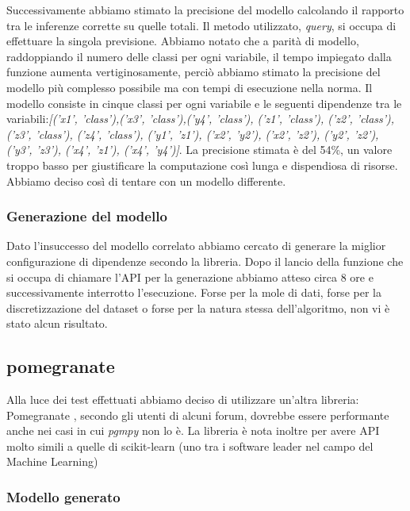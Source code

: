 \documentclass[12pt]{article}
\begin{document}
Successivamente abbiamo stimato la precisione del modello calcolando il rapporto tra le inferenze corrette su quelle totali. Il metodo utilizzato, \emph{query}, si occupa di effettuare la singola previsione. Abbiamo notato che a parità di modello, raddoppiando il numero delle classi per ogni variabile, il tempo impiegato dalla funzione aumenta vertiginosamente, perciò abbiamo stimato la precisione del modello più complesso possibile ma con tempi di esecuzione nella norma. \newline
Il modello consiste in cinque classi per ogni variabile e le seguenti dipendenze tra le variabili:\newline \emph{[('x1', 'class'),('x3', 'class'),('y4', 'class'), ('z1', 'class'), ('z2', 'class'), ('z3', 'class'), ('z4', 'class'), ('y1', 'z1'), ('x2', 'y2'), ('x2', 'z2'), ('y2', 'z2'), ('y3', 'z3'), ('x4', 'z1'),  ('x4', 'y4')]}.\newline
La precisione stimata è del 54\%, un valore troppo basso per giustificare la computazione così lunga e dispendiosa di risorse. Abbiamo deciso così di tentare con un modello differente.

\subsubsection{Generazione del modello}
Dato l'insuccesso del modello correlato abbiamo cercato di generare la miglior configurazione di dipendenze secondo la libreria. Dopo il lancio della funzione che si occupa di chiamare l'API per la generazione abbiamo atteso circa 8 ore e successivamente interrotto l'esecuzione. Forse per la mole di dati, forse per la discretizzazione del dataset o forse per la natura stessa dell'algoritmo, non vi è stato alcun risultato.

\subsection{pomegranate}
Alla luce dei test effettuati abbiamo deciso di utilizzare un'altra libreria: Pomegranate \cite{pomegranate}, secondo gli utenti di alcuni forum, dovrebbe essere performante anche nei casi in cui \emph{pgmpy} non lo è. La libreria è nota inoltre per avere API molto simili a quelle di scikit-learn \cite{scikit-learn} (uno tra i software leader nel campo del Machine Learning) 

\subsubsection{Modello generato}
\clearpage
\end{document}
